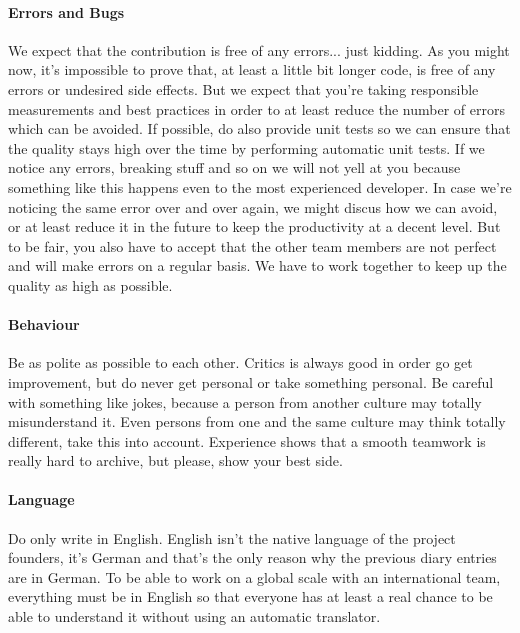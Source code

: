 \paragraph{Errors and Bugs}
We expect that the contribution is free of any errors... just kidding. As you might now, it's impossible to prove that, at least a little bit longer code, is free of any errors or undesired side effects. But we expect that you're taking responsible measurements and best practices in order to at least reduce the number of errors which can be avoided. If possible, do also provide unit tests so we can ensure that the quality stays high over the time by performing automatic unit tests. If we notice any errors, breaking stuff and so on we will not yell at you because something like this happens even to the most experienced developer. In case we're noticing the same error over and over again, we might discus how we can avoid, or at least reduce it in the future to keep the productivity at a decent level. But to be fair, you also have to accept that the other team members are not perfect and will make errors on a regular basis. We have to work together to keep up the quality as high as possible.


\paragraph{Behaviour}
Be as polite as possible to each other. Critics is always good in order go get improvement, but do never get personal or take something personal. Be careful with something like jokes, because a person from another culture may totally misunderstand it. Even persons from one and the same culture may think totally different, take this into account. Experience shows that a smooth teamwork is really hard to archive, but please, show your best side.


\paragraph{Language}
Do only write in English. English isn't the native language of the project founders, it's German and that's the only reason why the previous diary entries are in German. To be able to work on a global scale with an international team, everything must be in English so that everyone has at least a real chance to be able to understand it without using an automatic translator.


